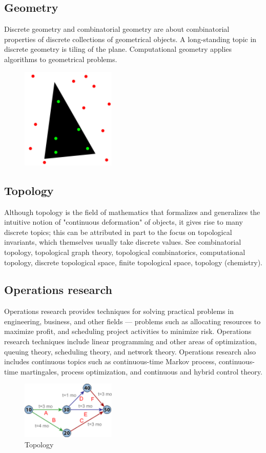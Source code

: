 \documentclass{article}
\begin{document}
\subsection{Geometry}
Discrete geometry and combinatorial geometry are about combinatorial properties of discrete collections of geometrical objects. A long-standing topic in discrete geometry is tiling of the plane. Computational geometry applies algorithms to geometrical problems.
\begin{figure}[h]
\includegraphics[width=0.4\textwidth]{se.png}
\caption{}
\end{figure} 
\subsection{Topology}
Although topology is the field of mathematics that formalizes and generalizes the intuitive notion of "continuous deformation" of objects, it gives rise to many discrete topics; this can be attributed in part to the focus on topological invariants, which themselves usually take discrete values. See combinatorial topology, topological graph theory, topological combinatorics, computational topology, discrete topological space, finite topological space, topology (chemistry). 
\subsection{Operations research}
Operations research provides techniques for solving practical problems in engineering, business, and other fields — problems such as allocating resources to maximize profit, and scheduling project activities to minimize risk. Operations research techniques include linear programming and other areas of optimization, queuing theory, scheduling theory, and network theory. Operations research also includes continuous topics such as continuous-time Markov process, continuous-time martingales, process optimization, and continuous and hybrid control theory.
\newpage
\begin{figure}[h]
\includegraphics[width=0.4\textwidth]{sf.png}
\caption{Topology}
\end{figure} 
\end{document}
